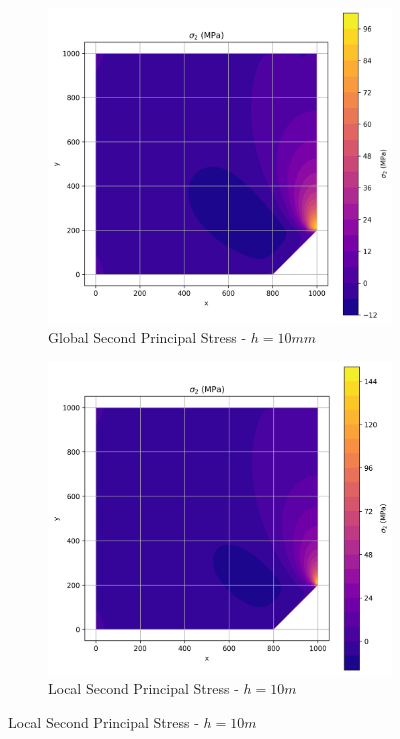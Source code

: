 \begin{figure}[H]
  \centering
  \begin{subfigure}[b]{0.45\textwidth}
    \centering
    \includegraphics[width=\textwidth]{GRAFICOS/Quad4/1.25mm_global/resultados - sigma_2.png}
    \caption{Global Second Principal Stress - $h=10mm$}
    \label{fig:img13}
  \end{subfigure}
  \hfill
  \begin{subfigure}[b]{0.45\textwidth}
    \centering
    \includegraphics[width=\textwidth]{GRAFICOS/Quad4/1.25mm_local/resultados - sigma_2.png}
    \caption{Local Second Principal Stress - $h=10m$}
    \label{fig:img23}
  \end{subfigure}
\end{figure}

